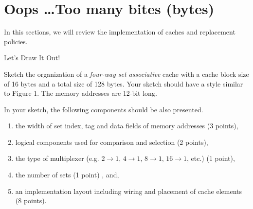 \section{Oops \dots Too many bites (bytes)}
In this sections, we will review the implementation of caches and
replacement policies.

\begin{questions}

\question[15] Let's Draw It Out!

Sketch the organization of a \emph{four-way set associative} cache
with a cache block size of 16 bytes and a total size of 128 bytes.
Your sketch should have a style similar to Figure 1. The memory
addresses are 12-bit long.

In your sketch, the following components should be also presented.

\begin{enumerate}
    \item the width of set index, tag and data fields of memory
    addresses (3 points),
    \item logical components used for comparison and selection
    (2 points),
    \item the type of multiplexer (e.g. $2\rightarrow1$,
    $4\rightarrow1$, $8\rightarrow1$, $16\rightarrow1$, etc.)
    (1 point),
    \item the number of sets (1 point) , and,
    \item an implementation layout including wiring and placement
    of cache elements (8 points).
\end{enumerate}




\end{questions}
